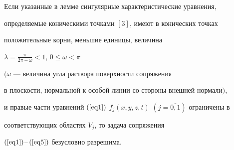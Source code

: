 \begin{thm}


Если указанные в лемме сингулярные характеристические уравнения, 


определяемые коническими точками $[3]$, имеют в конических точках 


положительные корни, меньшие единицы, величина


$\lambda=\frac{{\pi }}{{2\pi-\omega}} < 1$, ${0 \le \omega < \pi}$


$(\omega $ --- величина угла раствора поверхности сопряжения 


в плоскости, нормальной к особой линии со стороны внешней нормали$)$,


и правые части уравнений $(\ref{eq1})$ $f_{j} 


({x,y,z,t})$ $({j=\overline {0,1}})$ ограничены в 


соответствующих областях $V_{j} $, то задача сопряжения


$(\ref{eq1})$--\,$(\ref{eq5})$ безусловно разрешима.


\end{thm}








